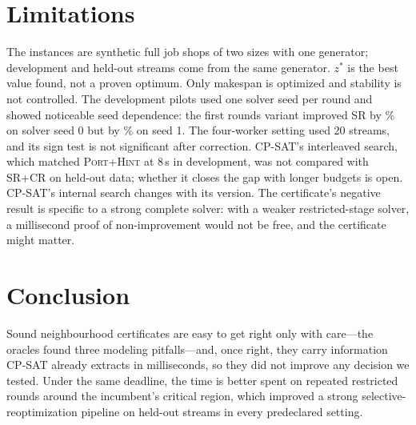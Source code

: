 \documentclass[letterpaper]{article} %
\newcommand{\base}{\textsc{SR}}
\newcommand{\crm}{\textsc{SR+CR}}
\newcommand{\ph}{\textsc{Port+Hint}}
\begin{document}
\section{Limitations}

The instances are synthetic full job shops of two sizes with one generator; development and held-out streams come from the same generator. $z^*$ is the best value found, not a proven optimum. Only makespan is optimized and stability is not controlled. The development pilots used one solver seed per round and showed noticeable seed dependence: the first rounds variant improved \base{} by \PilotOneASixrVsAOneRel\% on solver seed 0 but by \PilotEightASixrVsAOneRel\% on seed 1. The four-worker setting used 20 streams, and its sign test is not significant after correction. CP-SAT's interleaved search, which matched \ph{} at 8\,s in development, was not compared with \crm{} on held-out data; whether it closes the gap with longer budgets is open. CP-SAT's internal search changes with its version. The certificate's negative result is specific to a strong complete solver: with a weaker restricted-stage solver, a millisecond proof of non-improvement would not be free, and the certificate might matter.

\section{Conclusion}

Sound neighbourhood certificates are easy to get right only with care---the oracles found three modeling pitfalls---and, once right, they carry information CP-SAT already extracts in milliseconds, so they did not improve any decision we tested. Under the same deadline, the time is better spent on repeated restricted rounds around the incumbent's critical region, which improved a strong selective-reoptimization pipeline on held-out streams in every predeclared setting.


\end{document}
